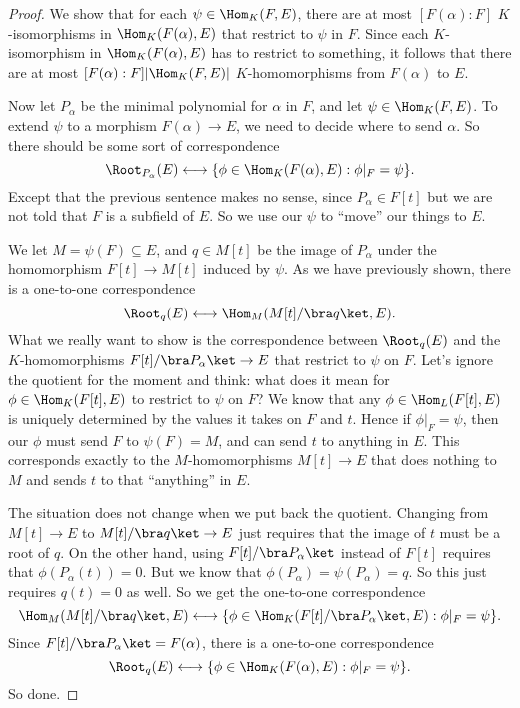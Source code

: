 \documentclass[a4paper]{article}
\begin{document}
\begin{proof}
  We show that for each $\psi \in \Hom_K(F, E)$, there are at most $[F(\alpha):F]$ $K$-isomorphisms in $\Hom_K(F(\alpha), E)$ that restrict to $\psi$ in $F$. Since each $K$-isomorphism in $\Hom_K(F(\alpha), E)$ has to restrict to something, it follows that there are at most $[F(\alpha): F] |\Hom_K(F, E)|$ $K$-homomorphisms from $F(\alpha)$ to $E$.

  Now let $P_\alpha$ be the minimal polynomial for $\alpha$ in $F$, and let $\psi \in \Hom_K(F, E)$. To extend $\psi$ to a morphism $F(\alpha) \to E$, we need to decide where to send $\alpha$. So there should be some sort of correspondence
  \[
    \Root_{P_\alpha}(E)\longleftrightarrow\{\phi \in \Hom_K(F(\alpha), E): \phi|_F = \psi\}.
  \]
  Except that the previous sentence makes no sense, since $P_\alpha \in F[t]$ but we are not told that $F$ is a subfield of $E$. So we use our $\psi$ to ``move'' our things to $E$.

  We let $M = \psi(F) \subseteq E$, and $q \in M[t]$ be the image of $P_\alpha$ under the homomorphism $F[t] \to M[t]$ induced by $\psi$. As we have previously shown, there is a one-to-one correspondence
  \[
    \Root_q(E) \longleftrightarrow \Hom_M(M[t]/\bra q \ket, E).
  \]
  What we really want to show is the correspondence between $\Root_q(E)$ and the $K$-homomorphisms $F[t]/\bra P_\alpha\ket \to E$ that restrict to $\psi$ on $F$. Let's ignore the quotient for the moment and think: what does it mean for $\phi \in \Hom_K(F[t], E)$ to restrict to $\psi$ on $F$? We know that any $\phi \in \Hom_L(F[t], E)$ is uniquely determined by the values it takes on $F$ and $t$. Hence if $\phi|_F = \psi$, then our $\phi$ must send $F$ to $\psi(F) = M$, and can send $t$ to anything in $E$. This corresponds exactly to the $M$-homomorphisms $M[t] \to E$ that does nothing to $M$ and sends $t$ to that ``anything'' in $E$.

  The situation does not change when we put back the quotient. Changing from $M[t] \to E$ to $M[t]/\bra q\ket \to E$ just requires that the image of $t$ must be a root of $q$. On the other hand, using $F[t]/\bra P_\alpha\ket$ instead of $F[t]$ requires that $\phi(P_\alpha(t)) = 0$. But we know that $\phi(P_\alpha) = \psi(P_\alpha) = q$. So this just requires $q(t) = 0$ as well. So we get the one-to-one correspondence
  \[
    \Hom_M(M[t]/\bra q \ket, E) \longleftrightarrow \{\phi \in \Hom_K(F[t]/\bra P_\alpha \ket, E): \phi|_F = \psi\}.
  \]
  Since $F[t]/\bra P_\alpha\ket = F(\alpha)$, there is a one-to-one correspondence
  \[
    \Root_q(E) \longleftrightarrow \{\phi \in \Hom_K(F(\alpha), E): \phi|_F = \psi\}.
  \]
  So done.
\end{proof}
\end{document}
